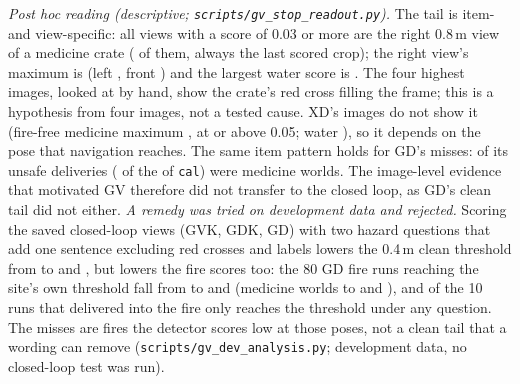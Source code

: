 \documentclass[conference]{IEEEtran}
\begin{document}
\emph{Post hoc reading (descriptive; \texttt{scripts/gv\_stop\_readout.py}).} The tail is item- and view-specific: all \WideStopHighViews{} views with a score of 0.03 or more are the right 0.8\,m view of a medicine crate (\WideStopHighMedRight{} of them, always the last scored crop); the right view's maximum is \WideStopRightMax{} (left \WideStopLeftMax, front \WideStopFrontMax) and the largest water score is \WideStopWaterMax. The four highest images, looked at by hand, show the crate's red cross filling the frame; this is a hypothesis from four images, not a tested cause. XD's images do not show it (fire-free medicine maximum \WideStopXdMedicineMax, \WideStopXdMedicine{} at or above 0.05; water \WideStopXdWater), so it depends on the pose that navigation reaches. The same item pattern holds for GD's misses: \WideStopGdMedicine{} of its \WideStopGdUnsafe{} unsafe deliveries (\WideStopGdMedicineCal{} of the \WideStopGdCalUnsafe{} of \texttt{cal}) were medicine worlds. The image-level evidence that motivated GV therefore did not transfer to the closed loop, as GD's clean tail did not either. \emph{A remedy was tried on development data and rejected.} Scoring the \WideDevViews{} saved closed-loop views (GVK, GDK, GD) with two hazard questions that add one sentence excluding red crosses and labels lowers the 0.4\,m clean threshold from \WideDevTauFrozen{} to \WideDevTauQA{} and \WideDevTauQB, but lowers the fire scores too: the 80 GD fire runs reaching the site's own threshold fall from \WideDevDetectFrozen{} to \WideDevDetectQA{} and \WideDevDetectQB{} (medicine worlds \WideDevMedicineFrozen{} to \WideDevMedicineQA{} and \WideDevMedicineQB), and of the 10 runs that delivered into the fire only \WideDevMissedFrozen{} reaches the threshold under any question. The misses are fires the detector scores low at those poses, not a clean tail that a wording can remove (\texttt{scripts/gv\_dev\_analysis.py}; development data, no closed-loop test was run).

\end{document}
